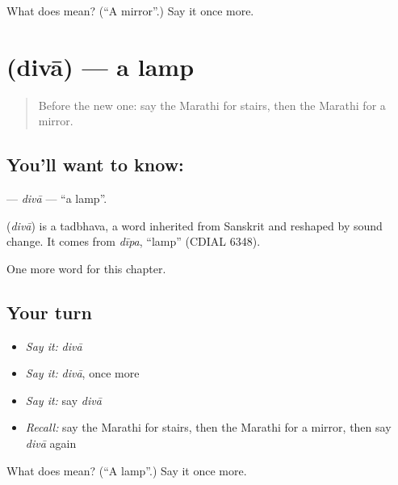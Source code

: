 \begin{tcolorbox}[breakable,colback=teal!4,colframe=teal!35!black,title={Before you move on}]
What does  mean? (\textquotedblleft{}A mirror\textquotedblright{}.) Say it once more.
\end{tcolorbox}
\section[\texorpdfstring{\mr{दिवा} (divā)}{दिवा (divā)}]{ (divā) — a lamp}

\label{lesson:MR-C91-diva}



\begin{quote}
Before the new one: say the Marathi for stairs, then the Marathi for a mirror.
\end{quote}

\subsection*{You'll want to know: }
\textbf{} — \emph{divā} — \textquotedblleft{}a lamp\textquotedblright{}.

\begin{cousinweb}
\textbf{} (\emph{divā}) is a tadbhava, a word inherited from Sanskrit and reshaped by sound change. It comes from \emph{dīpa}, \textquotedblleft{}lamp\textquotedblright{} (CDIAL 6348).
\end{cousinweb}

\begin{grammarlens}[title={What you've built}]
One more word for this chapter.
\end{grammarlens}

\subsection*{Your turn}
\begin{itemize}
\raggedright
  \item \emph{Say it:} \emph{divā}
  \item \emph{Say it:} \emph{divā}, once more
  \item \emph{Say it:} say \emph{divā}
  \item \emph{Recall:} say the Marathi for stairs, then the Marathi for a mirror, then say \emph{divā} again
\end{itemize}

\begin{tcolorbox}[breakable,colback=teal!4,colframe=teal!35!black,title={Before you move on}]
What does  mean? (\textquotedblleft{}A lamp\textquotedblright{}.) Say it once more.
\end{tcolorbox}
